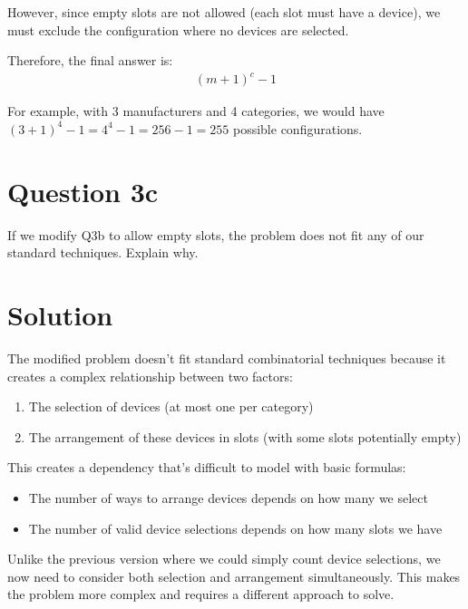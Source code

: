 \documentclass{article}
\begin{document}
However, since empty slots are not allowed (each slot must have a device), we must exclude the configuration where no devices are selected.

Therefore, the final answer is:
\begin{align}
    (m + 1)^c - 1
\end{align}

For example, with 3 manufacturers and 4 categories, we would have $(3 + 1)^4 - 1 = 4^4 - 1 = 256 - 1 = 255$ possible configurations.



\section*{Question 3c}

If we modify Q3b to allow empty slots, the problem does not fit any of our standard techniques. Explain why.


\section*{Solution}

The modified problem doesn't fit standard combinatorial techniques because it creates a complex relationship between two factors:

\begin{enumerate}
    \item The selection of devices (at most one per category)
    \item The arrangement of these devices in slots (with some slots potentially empty)
\end{enumerate}

This creates a dependency that's difficult to model with basic formulas:
\begin{itemize}
    \item The number of ways to arrange devices depends on how many we select
    \item The number of valid device selections depends on how many slots we have
\end{itemize}

Unlike the previous version where we could simply count device selections, we now need to consider both selection and arrangement simultaneously. This makes the problem more complex and requires a different approach to solve.
\end{document}

